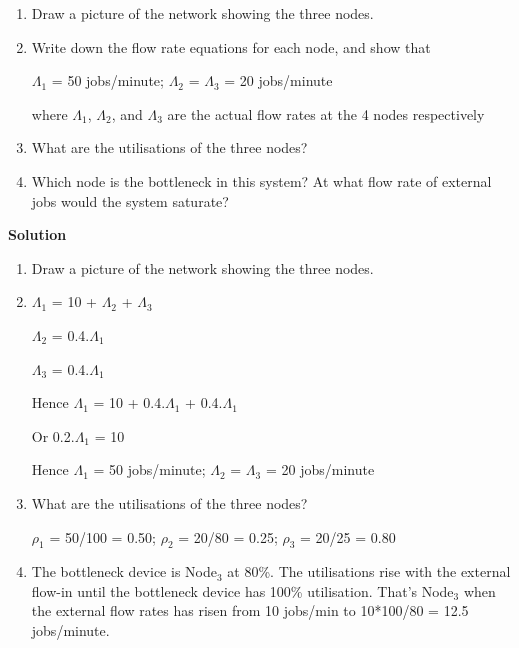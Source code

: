 \documentclass[12pt,fleqn]{report}
\begin{document}
\begin{enumerate}
\item Draw a picture of the network showing the three nodes.

\item Write down the flow rate equations for each node,
and show that 
\begin{center}
$\Lambda_1$ = 50 jobs/minute; $\Lambda_2$ =  $\Lambda_3$ = 20 jobs/minute
\end{center}

where $\Lambda_1$, $\Lambda_2$, and $\Lambda_3$
are the actual flow rates at the 4 nodes respectively

\item What are the utilisations of the three nodes?

\item Which node is the bottleneck in this system?
At what flow rate of external jobs would the system saturate?

\end{enumerate}

\noindent
{\bf Solution}

\begin{enumerate}
\item Draw a picture of the network showing the three nodes.

\item  $\Lambda_1$ = 10 + $\Lambda_2$ + $\Lambda_3$

$\Lambda_2$ = 0.4.$\Lambda_1$ 

$\Lambda_3$ = 0.4.$\Lambda_1$ 

Hence $\Lambda_1$ = 10 + 0.4.$\Lambda_1$ + 0.4.$\Lambda_1$

Or 0.2.$\Lambda_1$ = 10

Hence $\Lambda_1$ = 50 jobs/minute; 
$\Lambda_2$ =  $\Lambda_3$ = 20 jobs/minute

\item What are the utilisations of the three nodes?

$\rho_1$ = 50/100 = 0.50; $\rho_2$ = 20/80 = 0.25; $\rho_3$ = 20/25 = 0.80

\item The bottleneck device is Node$_3$ at 80\%.
The utilisations rise with the external flow-in until 
the bottleneck device has 100\% utilisation.
That's Node$_3$ when the external flow rates has risen from 10
jobs/min to 10*100/80 = 12.5 jobs/minute.

\end{enumerate}
\end{document}
